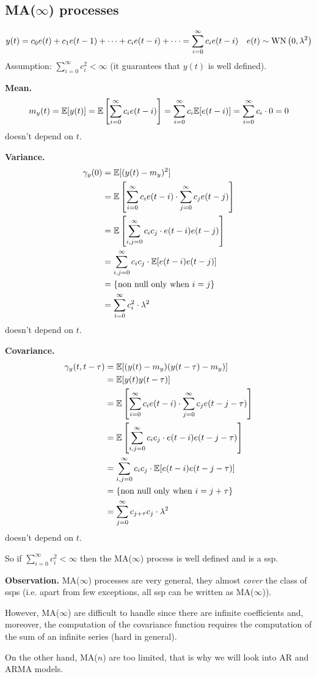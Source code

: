 \subsection{MA(\texorpdfstring{$\infty$}{infinity}) processes}

\[
	y(t)=c_{0} e(t)+c_{1} e(t-1)+\cdots+c_{i} e(t-i)+\cdots=\sum_{i=0}^{\infty} c_{i} e(t-i) \quad e(t) \sim \operatorname{WN}\left(0, \lambda^{2}\right)
\]
Assumption: $\sum_{i=0}^{\infty} c_{i}^{2}<\infty$ (it guarantees that $y(t)$ is well defined).

\textbf{Mean.}
\[
	m_{y}(t)=\mathbb{E}[y(t)]=\mathbb{E}\left[\sum_{i=0}^{\infty} c_{i} e(t-i)\right]=\sum_{i=0}^{\infty} c_{i} \mathbb{E}[e(t-i)]=\sum_{i=0}^{\infty} c_{i} \cdot 0=0
\]
doesn't depend on $t$.

\textbf{Variance.}
\begin{align*}
	\gamma_{y}(0)&=\mathbb{E}[(y(t)-m_{y})^{2}]\\
	&=\mathbb{E}\left[\sum_{i=0}^{\infty} c_{i} e(t-i) \cdot \sum_{j=0}^{\infty} c_{j} e(t-j)\right]\\
	&=\mathbb{E}\left[\sum_{i, j=0}^{\infty} c_{i} c_{j} \cdot e(t-i) e(t-j)\right]\\
	&=\sum_{i, j=0}^{\infty} c_{i} c_{j} \cdot \mathbb{E}[e(t-i) e(t-j)]\\
	&=\{\text{non null only when }i=j\}\\
	&=\sum_{i=0}^{\infty} c_{i}^2 \cdot\lambda^2 
\end{align*}
doesn't depend on $t$.

\textbf{Covariance.}
\begin{align*}
	\gamma_{y}(t, t-\tau) &=\mathbb{E}[(y(t)-m_{y}) (y(t-\tau)-m_{y})]\\
	&=\mathbb{E}[y(t) y(t-\tau)]\\
	&=\mathbb{E}\left[\sum_{i=0}^{\infty} c_{i} e(t-i) \cdot \sum_{j=0}^{\infty} c_{j} e(t-j-\tau)\right]\\
	&=\mathbb{E}\left[\sum_{i, j=0}^{\infty} c_{i} c_{j} \cdot e(t-i) e(t-j-\tau)\right]\\
	&=\sum_{i, j=0}^{\infty} c_{i} c_{j} \cdot \mathbb{E}[e(t-i) e(t-j-\tau)]\\
	&=\{\text{non null only when }i=j+\tau\}\\
	&=\sum_{j=0}^{\infty} c_{j+\tau}c_{j}\cdot\lambda^2 
\end{align*}
doesn't depend on $t$.

So if $\sum_{i=0}^{\infty} c_{i}^{2}<\infty$ then the MA($\infty $) process is well defined and is a \gls{ssp}.

\textbf{Observation.} MA($\infty$) processes are very general, they almost \emph{cover} the class of \glspl{ssp} (i.e. apart from few exceptions, all \gls{ssp} can be written as MA($\infty$)).

However, MA($\infty$) are difficult to handle since there are infinite coefficients and, moreover, the computation of the covariance function requires the computation of the sum of an infinite series (hard in general).

On the other hand, MA($n$) are too limited, that is why we will look into AR and ARMA models.